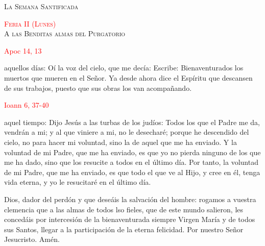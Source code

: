 \documentclass[10pt]{article}
\begin{document}
\begin{center}
      \textsc{\Large La Semana Santificada}
\end{center}

\begin{multicols}{2}


      \begin{center}
            \textsc{\textcolor{red}{Feria II (Lunes)}\\ {\large A las Benditas almas del Purgatorio}}
      \end{center}

      \hfill\textcolor{red}{Apoc 14, 13}

      aquellos días: Oí la voz del cielo, que me decía: Escribe: Bienaventurados los muertos que mueren en el Señor. Ya desde ahora dice el Espíritu que descansen
      de sus trabajos, puesto que sus obras los van acompañando.

      \vspace{2mm}

      \hfill\textcolor{red}{Ioann 6, 37-40}

      aquel tiempo: Dijo Jesús a las turbas de los judíos: Todos los que el Padre me da, vendrán a mi; y al que viniere a mi, no le desecharé; porque he descendido
      del cielo, no para hacer mi voluntad, sino la de aquel que me ha enviado. Y la voluntad de mi Padre, que me ha enviado, es que yo no pierda ninguno de los que
      me ha dado, sino que los resucite a todos en el último día. Por tanto, la voluntad de mi Padre, que me ha enviado, es que todo el que ve al Hijo, y cree en él,
      tenga vida eterna, y yo le resucitaré en el último día.

      \vspace{2mm}

      \begin{otherlanguage}{latin}
            

            \vspace{1mm}

            
      \end{otherlanguage}

      \vspace{2mm}

      Dios, dador del perdón y que deseáis la salvación del hombre: rogamos a vuestra clemencia que a las almas de todos lso fieles, que de este mundo salieron,
      les concedáis por intercesión de la bienaventurada siempre Virgen María y de todos sus Santos, llegar a la participación de la eterna felicidad. Por nuestro
      Señor Jesucristo. Amén.
      

\end{multicols}
\end{document}
